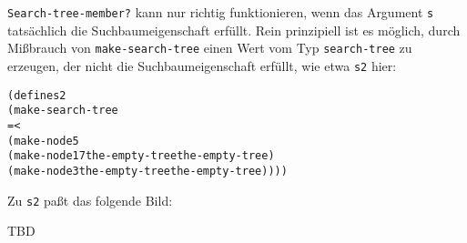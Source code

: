 \texttt{Search-tree-member?} kann nur richtig funktionieren, wenn das
Argument \texttt{s} tatsächlich die Suchbaumeigenschaft
erfüllt.  Rein prinzipiell ist es möglich, durch Mißbrauch von
\texttt{make-search-tree} einen Wert vom Typ \texttt{search-tree} zu
erzeugen, der nicht die Suchbaumeigenschaft erfüllt, wie etwa
\texttt{s2} hier:
%
\begin{alltt}
(define s2
  (make-search-tree
   = <
   (make-node 5
              (make-node 17 the-empty-tree the-empty-tree)
              (make-node 3 the-empty-tree the-empty-tree))))
\end{alltt}
%
Zu \texttt{s2} paßt das folgende Bild:
%

TBD

